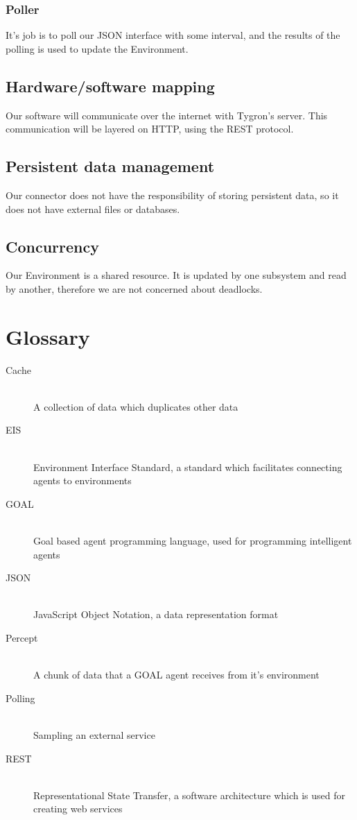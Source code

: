 \documentclass[a4paper]{article}
\begin{document}
\subsubsection{Poller}
It’s job is to poll our JSON interface with some interval, and the results of the polling is used to update the Environment. 

\subsection{Hardware/software mapping}
Our software will communicate over the internet with Tygron’s server. This communication will be layered on HTTP, using the REST protocol.

\subsection{Persistent data management}
Our connector does not have the responsibility of storing persistent data, so it does not have external files or databases.

\subsection{Concurrency}
Our Environment is a shared resource. It is updated by one subsystem and read by another, therefore we are not concerned about deadlocks.

\clearpage
\section{Glossary}
\begin{description}
\item[Cache] \hfill \\
A collection of data which duplicates other data
\item[EIS] \hfill \\
Environment Interface Standard, a standard which facilitates connecting agents to environments
\item[GOAL] \hfill \\
Goal based agent programming language, used for programming intelligent agents
\item[JSON] \hfill \\
JavaScript Object Notation, a data representation format
\item[Percept] \hfill \\
A chunk of data that a GOAL agent receives from it’s environment
\item[Polling] \hfill \\
Sampling an external service
\item[REST] \hfill \\
Representational State Transfer, a software architecture which is used for creating web services
\end{description}
\end{document}
